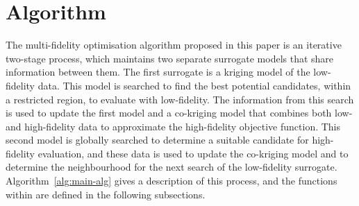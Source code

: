 \documentclass[journal]{IEEEtran}
\begin{document}
\section{\AlgName{} Algorithm}\label{sec:method}
The multi-fidelity optimisation algorithm proposed in this paper is an iterative two-stage process, which maintains two separate surrogate models that share information between them. The first surrogate is a kriging model of the low-fidelity data. This model is searched to find the best potential candidates, within a restricted region, to evaluate with low-fidelity. The information from this search is used to update the first model and a co-kriging model that combines both low- and high-fidelity data to approximate the high-fidelity objective function. This second model is globally searched to determine a suitable candidate for high-fidelity evaluation, and these data is used to update the co-kriging model and to determine the neighbourhood for the next search of the low-fidelity surrogate. Algorithm~\ref{alg:main-alg} gives a description of this process, and the functions within are defined in the following subsections.

\begin{algorithm}[h!]
\caption{\AlgName{}}
\label{alg:main-alg}
{\footnotesize 
\begin{algorithmic}[1]
 
 
  
   
   
   
   
   
   
   
   
     
  \ENDIF
\ENDWHILE
\end{algorithmic}
}
\end{algorithm}
\end{document}
